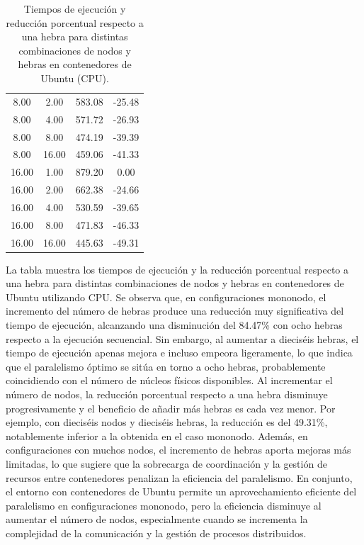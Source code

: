 \begin{table}[ht]
\begin{tabular}{|c|c|c|c|}
        8.00           & 2.00            & 583.08              & -25.48                         \\
        8.00           & 4.00            & 571.72              & -26.93                         \\
        8.00           & 8.00            & 474.19              & -39.39                         \\
        8.00           & 16.00           & 459.06              & -41.33                         \\
        16.00          & 1.00            & 879.20              & 0.00                           \\
        16.00          & 2.00            & 662.38              & -24.66                         \\
        16.00          & 4.00            & 530.59              & -39.65                         \\
        16.00          & 8.00            & 471.83              & -46.33                         \\
        16.00          & 16.00           & 445.63              & -49.31                         \\
        \hline
    \end{tabular}
    \caption{Tiempos de ejecución y reducción porcentual respecto a una hebra para distintas combinaciones de nodos y hebras en contenedores de Ubuntu (CPU).}
    \label{tab:thread_sweep_ubuntu_docker_time}
\end{table}

La tabla muestra los tiempos de ejecución y la reducción porcentual respecto a una hebra para distintas combinaciones de nodos y hebras en contenedores de Ubuntu utilizando CPU. Se observa que, en configuraciones mononodo, el incremento del número de hebras produce una reducción muy significativa del tiempo de ejecución, alcanzando una disminución del 84.47\% con ocho hebras respecto a la ejecución secuencial. Sin embargo, al aumentar a dieciséis hebras, el tiempo de ejecución apenas mejora e incluso empeora ligeramente, lo que indica que el paralelismo óptimo se sitúa en torno a ocho hebras, probablemente coincidiendo con el número de núcleos físicos disponibles. Al incrementar el número de nodos, la reducción porcentual respecto a una hebra disminuye progresivamente y el beneficio de añadir más hebras es cada vez menor. Por ejemplo, con dieciséis nodos y dieciséis hebras, la reducción es del 49.31\%, notablemente inferior a la obtenida en el caso mononodo. Además, en configuraciones con muchos nodos, el incremento de hebras aporta mejoras más limitadas, lo que sugiere que la sobrecarga de coordinación y la gestión de recursos entre contenedores penalizan la eficiencia del paralelismo. En conjunto, el entorno con contenedores de Ubuntu permite un aprovechamiento eficiente del paralelismo en configuraciones mononodo, pero la eficiencia disminuye al aumentar el número de nodos, especialmente cuando se incrementa la complejidad de la comunicación y la gestión de procesos distribuidos.

